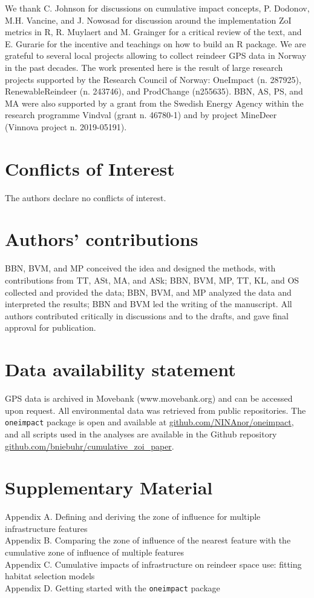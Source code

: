 \documentclass[titlepage]{article}
\begin{document}
We thank C. Johnson for discussions on cumulative impact concepts, P. Dodonov, M.H. Vancine, and J. Nowosad for discussion around the implementation ZoI metrics in R, R. Muylaert and M. Grainger for a critical review of the text, and E. Gurarie for the incentive and teachings on how to build an R package. We are grateful to several local projects allowing to collect reindeer GPS data in Norway in the past decades. The work presented here is the
result of large research projects supported by the Research Council of Norway: OneImpact (n. 287925), RenewableReindeer (n. 243746), and ProdChange (n255635). BBN, AS, PS, and MA were also supported by a grant from the Swedish Energy Agency within the research programme Vindval (grant n. 46780-1) and by project MineDeer (Vinnova project n. 2019-05191).

\section*{Conflicts of Interest}

The authors declare no conflicts of interest.

\section*{Authors’ contributions}

BBN, BVM, and MP conceived the idea and designed the methods, with contributions from TT, ASt, MA, and ASk; BBN, BVM, MP, TT, KL, and OS collected and provided the data; BBN, BVM, and MP analyzed the data and interpreted the results; BBN and BVM led the writing of the manuscript. All authors contributed critically in discussions and to the drafts, and gave final approval for publication.

\section*{Data availability statement}

GPS data is archived in Movebank (www.movebank.org) and can be accessed upon request. All environmental data was retrieved from public repositories. The \verb|oneimpact| package is open and available at \url{github.com/NINAnor/oneimpact}, and all scripts used in the analyses are available in the Github repository \url{github.com/bniebuhr/cumulative_zoi_paper}.

\section*{Supplementary Material}

Appendix A. Defining and deriving the zone of influence for multiple infrastructure features \\
Appendix B. Comparing the zone of influence of the nearest feature with the cumulative zone of influence of multiple features \\
Appendix C. Cumulative impacts of infrastructure on reindeer space use: fitting habitat selection models \\
Appendix D. Getting started with the \verb|oneimpact| package \\



\end{document}
